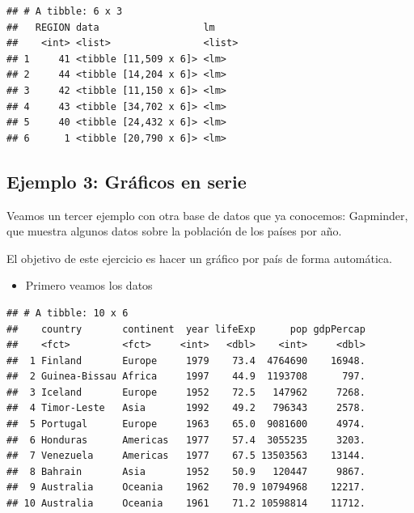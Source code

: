 \documentclass[]{book}
\newenvironment{Shaded}{\begin{snugshade}}{\end{snugshade}}
\newcommand{\DecValTok}[1]{\textcolor[rgb]{0.00,0.00,0.81}{#1}}
\newcommand{\KeywordTok}[1]{\textcolor[rgb]{0.13,0.29,0.53}{\textbf{#1}}}
\newcommand{\NormalTok}[1]{#1}
\newcommand{\OperatorTok}[1]{\textcolor[rgb]{0.81,0.36,0.00}{\textbf{#1}}}
\newcommand{\StringTok}[1]{\textcolor[rgb]{0.31,0.60,0.02}{#1}}
\providecommand{\tightlist}{%
  \setlength{\itemsep}{0pt}\setlength{\parskip}{0pt}}
\begin{document}
\begin{verbatim}
## # A tibble: 6 x 3
##   REGION data                  lm    
##    <int> <list>                <list>
## 1     41 <tibble [11,509 x 6]> <lm>  
## 2     44 <tibble [14,204 x 6]> <lm>  
## 3     42 <tibble [11,150 x 6]> <lm>  
## 4     43 <tibble [34,702 x 6]> <lm>  
## 5     40 <tibble [24,432 x 6]> <lm>  
## 6      1 <tibble [20,790 x 6]> <lm>
\end{verbatim}

\hypertarget{ejemplo-3-graficos-en-serie}{%
\subsection{Ejemplo 3: Gráficos en serie}\label{ejemplo-3-graficos-en-serie}}

Veamos un tercer ejemplo con otra base de datos que ya conocemos: Gapminder, que muestra algunos datos sobre la población de los países por año.

El objetivo de este ejercicio es hacer un gráfico por país de forma automática.

\begin{itemize}
\tightlist
\item
  Primero veamos los datos
\end{itemize}

\begin{Shaded}
\end{Shaded}

\begin{verbatim}
## # A tibble: 10 x 6
##    country       continent  year lifeExp      pop gdpPercap
##    <fct>         <fct>     <int>   <dbl>    <int>     <dbl>
##  1 Finland       Europe     1979    73.4  4764690    16948.
##  2 Guinea-Bissau Africa     1997    44.9  1193708      797.
##  3 Iceland       Europe     1952    72.5   147962     7268.
##  4 Timor-Leste   Asia       1992    49.2   796343     2578.
##  5 Portugal      Europe     1963    65.0  9081600     4974.
##  6 Honduras      Americas   1977    57.4  3055235     3203.
##  7 Venezuela     Americas   1977    67.5 13503563    13144.
##  8 Bahrain       Asia       1952    50.9   120447     9867.
##  9 Australia     Oceania    1962    70.9 10794968    12217.
## 10 Australia     Oceania    1961    71.2 10598814    11712.
\end{verbatim}
\end{document}

